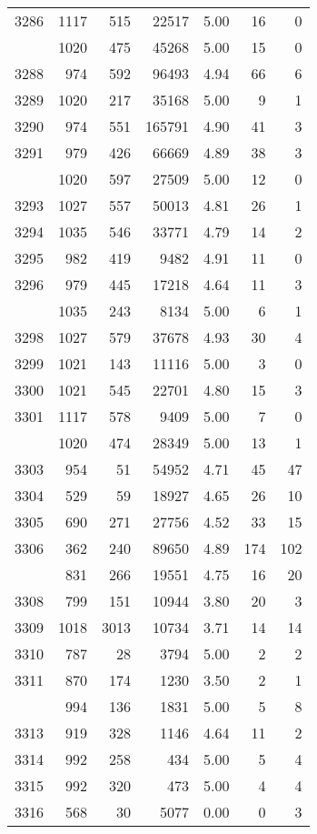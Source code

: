 \documentclass[
]{article}
\begin{document}
\begin{table}
\begin{tabular}[t]{lrrrrrr}
3286 & 1117 & 515 & 22517 & 5.00 & 16 & 0\\
\addlinespace
3287 & 1020 & 475 & 45268 & 5.00 & 15 & 0\\
3288 & 974 & 592 & 96493 & 4.94 & 66 & 6\\
3289 & 1020 & 217 & 35168 & 5.00 & 9 & 1\\
3290 & 974 & 551 & 165791 & 4.90 & 41 & 3\\
3291 & 979 & 426 & 66669 & 4.89 & 38 & 3\\
\addlinespace
3292 & 1020 & 597 & 27509 & 5.00 & 12 & 0\\
3293 & 1027 & 557 & 50013 & 4.81 & 26 & 1\\
3294 & 1035 & 546 & 33771 & 4.79 & 14 & 2\\
3295 & 982 & 419 & 9482 & 4.91 & 11 & 0\\
3296 & 979 & 445 & 17218 & 4.64 & 11 & 3\\
\addlinespace
3297 & 1035 & 243 & 8134 & 5.00 & 6 & 1\\
3298 & 1027 & 579 & 37678 & 4.93 & 30 & 4\\
3299 & 1021 & 143 & 11116 & 5.00 & 3 & 0\\
3300 & 1021 & 545 & 22701 & 4.80 & 15 & 3\\
3301 & 1117 & 578 & 9409 & 5.00 & 7 & 0\\
\addlinespace
3302 & 1020 & 474 & 28349 & 5.00 & 13 & 1\\
3303 & 954 & 51 & 54952 & 4.71 & 45 & 47\\
3304 & 529 & 59 & 18927 & 4.65 & 26 & 10\\
3305 & 690 & 271 & 27756 & 4.52 & 33 & 15\\
3306 & 362 & 240 & 89650 & 4.89 & 174 & 102\\
\addlinespace
3307 & 831 & 266 & 19551 & 4.75 & 16 & 20\\
3308 & 799 & 151 & 10944 & 3.80 & 20 & 3\\
3309 & 1018 & 3013 & 10734 & 3.71 & 14 & 14\\
3310 & 787 & 28 & 3794 & 5.00 & 2 & 2\\
3311 & 870 & 174 & 1230 & 3.50 & 2 & 1\\
\addlinespace
3312 & 994 & 136 & 1831 & 5.00 & 5 & 8\\
3313 & 919 & 328 & 1146 & 4.64 & 11 & 2\\
3314 & 992 & 258 & 434 & 5.00 & 5 & 4\\
3315 & 992 & 320 & 473 & 5.00 & 4 & 4\\
3316 & 568 & 30 & 5077 & 0.00 & 0 & 3\\

\end{tabular}
\end{table}
\end{document}

